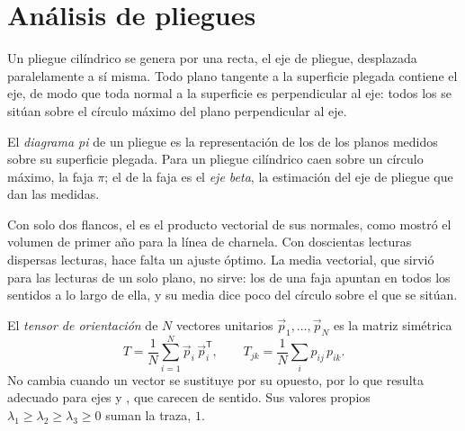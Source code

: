 \section{Análisis de pliegues}\label{sec:b3:structural-analysis:folds}

Un pliegue cilíndrico se genera por una recta, el eje de pliegue, desplazada
paralelamente a sí misma. Todo plano tangente a la superficie plegada contiene el
eje, de modo que toda normal a la superficie es perpendicular al eje: todos los
 se sitúan sobre el círculo máximo del plano perpendicular al eje.

\begin{definition}\label{def:b3:structural-analysis:pi}
El \emph{diagrama pi} de un pliegue es la representación de los  de
los planos medidos sobre su superficie plegada. Para un pliegue cilíndrico caen sobre
un círculo máximo, la faja $\pi$; el  de la faja es el
\emph{eje beta}, la estimación del eje de pliegue que dan las
medidas.
\end{definition}

Con solo dos flancos, el  es el producto vectorial de sus normales, como
mostró el volumen de primer año para la línea de charnela. Con doscientas lecturas dispersas
lecturas, hace falta un ajuste óptimo. La media vectorial, que sirvió para las lecturas
de un solo plano, no sirve: los  de una faja apuntan en todos los sentidos a lo largo de ella, y
su media dice poco del círculo sobre el que se sitúan.

\begin{definition}\label{def:b3:structural-analysis:orientation-tensor}
El \emph{tensor de orientación} de $N$ vectores unitarios
$\vec p_1, \dots, \vec p_N$ es la matriz simétrica
\[
  T = \frac1N\sum_{i=1}^N \vec p_i\,\vec p_i^{\mathsf T},
  \qquad T_{jk} = \frac1N\sum_i p_{ij}\,p_{ik} .
\]
No cambia cuando un vector se sustituye por su opuesto, por lo que resulta adecuado para
ejes y , que carecen de sentido. Sus valores propios $\lambda_1 \ge \lambda_2
\ge \lambda_3 \ge 0$ suman la traza, $1$.
\end{definition}

